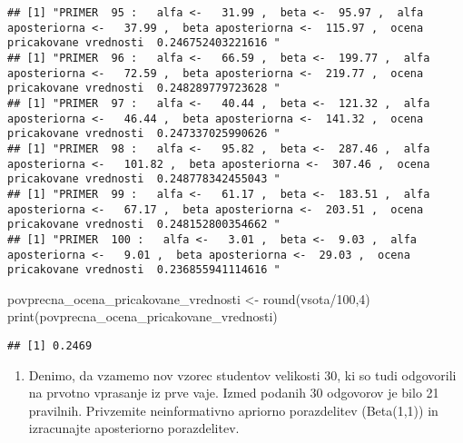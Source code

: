 \documentclass[
]{article}
\newenvironment{Shaded}{\begin{snugshade}}{\end{snugshade}}
\newcommand{\DecValTok}[1]{\textcolor[rgb]{0.00,0.00,0.81}{#1}}
\newcommand{\FunctionTok}[1]{\textcolor[rgb]{0.00,0.00,0.00}{#1}}
\newcommand{\NormalTok}[1]{#1}
\newcommand{\OtherTok}[1]{\textcolor[rgb]{0.56,0.35,0.01}{#1}}
\newcommand{\SpecialCharTok}[1]{\textcolor[rgb]{0.00,0.00,0.00}{#1}}
\providecommand{\tightlist}{%
  \setlength{\itemsep}{0pt}\setlength{\parskip}{0pt}}
\begin{document}
\begin{verbatim}
## [1] "PRIMER  95 :   alfa <-   31.99 ,  beta <-  95.97 ,  alfa aposteriorna <-   37.99 ,  beta aposteriorna <-  115.97 ,  ocena pricakovane vrednosti  0.246752403221616 "
## [1] "PRIMER  96 :   alfa <-   66.59 ,  beta <-  199.77 ,  alfa aposteriorna <-   72.59 ,  beta aposteriorna <-  219.77 ,  ocena pricakovane vrednosti  0.248289779723628 "
## [1] "PRIMER  97 :   alfa <-   40.44 ,  beta <-  121.32 ,  alfa aposteriorna <-   46.44 ,  beta aposteriorna <-  141.32 ,  ocena pricakovane vrednosti  0.247337025990626 "
## [1] "PRIMER  98 :   alfa <-   95.82 ,  beta <-  287.46 ,  alfa aposteriorna <-   101.82 ,  beta aposteriorna <-  307.46 ,  ocena pricakovane vrednosti  0.248778342455043 "
## [1] "PRIMER  99 :   alfa <-   61.17 ,  beta <-  183.51 ,  alfa aposteriorna <-   67.17 ,  beta aposteriorna <-  203.51 ,  ocena pricakovane vrednosti  0.248152800354662 "
## [1] "PRIMER  100 :   alfa <-   3.01 ,  beta <-  9.03 ,  alfa aposteriorna <-   9.01 ,  beta aposteriorna <-  29.03 ,  ocena pricakovane vrednosti  0.236855941114616 "
\end{verbatim}

\begin{Shaded}
\begin{Highlighting}[]
\NormalTok{povprecna\_ocena\_pricakovane\_vrednosti }\OtherTok{\textless{}{-}} \FunctionTok{round}\NormalTok{(vsota}\SpecialCharTok{/}\DecValTok{100}\NormalTok{,}\DecValTok{4}\NormalTok{)}
\FunctionTok{print}\NormalTok{(povprecna\_ocena\_pricakovane\_vrednosti)}
\end{Highlighting}
\end{Shaded}

\begin{verbatim}
## [1] 0.2469
\end{verbatim}

\begin{enumerate}
\def\labelenumi{\arabic{enumi}.}
\setcounter{enumi}{2}
\tightlist
\item
  Denimo, da vzamemo nov vzorec studentov velikosti 30, ki so tudi
  odgovorili na prvotno vprasanje iz prve vaje. Izmed podanih 30
  odgovorov je bilo 21 pravilnih. Privzemite neinformativno apriorno
  porazdelitev (Beta(1,1)) in izracunajte aposteriorno porazdelitev.
\end{enumerate}
\end{document}
